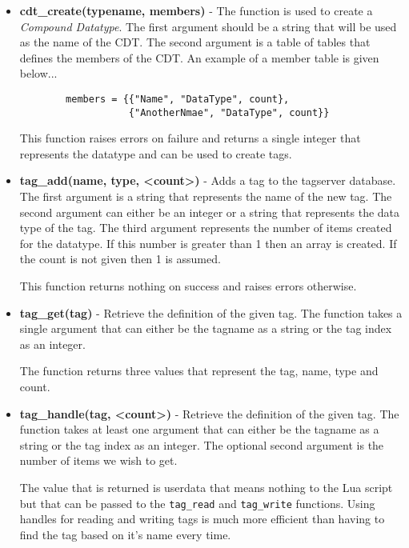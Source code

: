 \begin{itemize}
	\item \textbf{cdt\_create(typename, members)} - The function is used to
	create a
	\textit{Compound Datatype}.  The first argument should be a string that
	will be used as the name of the CDT.  The second argument is a table of
	tables that defines the members of the CDT.  An example of a member
    table is given below...
    \begin{verbatim}
        members = {{"Name", "DataType", count},
                   {"AnotherNmae", "DataType", count}}
    \end{verbatim}

    This function raises errors on failure and returns a single integer that
    represents the datatype and can be used to create tags.

	\item \textbf{tag\_add(name, type, <count>)} - Adds a tag to the tagserver
	database.  The first argument is a string that
    represents the name of the new tag.  The second argument can either be an
    integer or a string that represents the data type of the tag.  The third
    argument represents the number of items created for the datatype.
    If this number is greater than 1 then an array is created.  If the count is
    not given then 1 is assumed.

    This function returns nothing on success and raises errors otherwise.

	\item \textbf{tag\_get(tag)} - Retrieve the definition of the given tag.
	The function takes a single
    argument that can either be the tagname as a string or the tag index as an
    integer.

    The function returns three values that represent the tag, name, type and
    count.

	\item \textbf{tag\_handle(tag, <count>)} - Retrieve the definition of the
	given tag.  The function takes at least one
    argument that can either be the tagname as a string or the tag index as an
    integer.  The optional second argument is the number of items we wish
    to get.

    The value that is returned is userdata that means nothing to the Lua script
    but that can be passed to the \texttt{tag\_read} and \texttt{tag\_write}
    functions.  Using handles for reading and writing tags is much more
    efficient
    than having to find the tag based on it's name every time.


\end{itemize}
